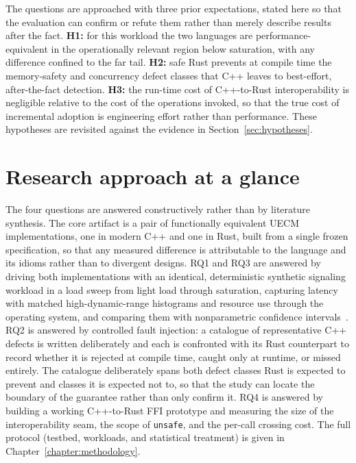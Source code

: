 \documentclass[english,twoside,openright,a4paper,censored,csm,software-track-2020]{HYthesisML}
\begin{document}
The questions are approached with three prior expectations, stated here so that the evaluation
can confirm or refute them rather than merely describe results after the fact. \textbf{H1:} for
this workload the two languages are performance-equivalent in the operationally relevant region
below saturation, with any difference confined to the far tail. \textbf{H2:} safe Rust prevents
at compile time the memory-safety and concurrency defect classes that C++ leaves to
best-effort, after-the-fact detection. \textbf{H3:} the run-time cost of C++-to-Rust
interoperability is negligible relative to the cost of the operations invoked, so that the true
cost of incremental adoption is engineering effort rather than performance. These hypotheses are
revisited against the evidence in Section~\ref{sec:hypotheses}.

\section{Research approach at a glance}
The four questions are answered constructively rather than by literature synthesis. The core
artifact is a pair of functionally equivalent UECM implementations, one in modern C++ and one in
Rust, built from a single frozen specification, so that any measured difference is attributable
to the language and its idioms rather than to divergent designs. RQ1 and RQ3 are answered by
driving both implementations with an identical, deterministic synthetic signaling workload in a
load sweep from light load through saturation, capturing latency with matched high-dynamic-range
histograms and resource use through the operating system, and comparing them with nonparametric
confidence intervals~\cite{georges2007rigorous}. RQ2 is answered by controlled fault injection:
a catalogue of representative C++ defects is written deliberately and each is confronted with its
Rust counterpart to record whether it is rejected at compile time, caught only at runtime, or
missed entirely. The catalogue deliberately spans both defect classes Rust is expected to
prevent and classes it is expected not to, so that the study can locate the boundary of the
guarantee rather than only confirm it. RQ4 is answered by building a working C++-to-Rust FFI
prototype and measuring
the size of the interoperability seam, the scope of \texttt{unsafe}, and the per-call crossing
cost. The full protocol (testbed, workloads, and statistical treatment) is given in
Chapter~\ref{chapter:methodology}.
\end{document}

